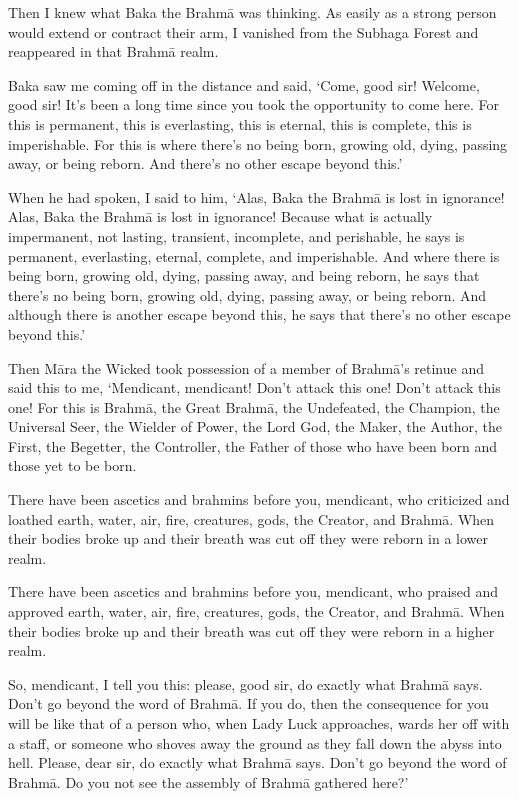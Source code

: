 \documentclass[12pt,openany]{book}%
\begin{document}
Then I knew what Baka the \textsanskrit{Brahmā} was thinking. As easily as a strong person would extend or contract their arm, I vanished from the Subhaga Forest and reappeared in that \textsanskrit{Brahmā} realm. 

Baka saw me coming off in the distance and said, ‘Come, good sir! Welcome, good sir! It’s been a long time since you took the opportunity to come here. For this is permanent, this is everlasting, this is eternal, this is complete, this is imperishable. For this is where there’s no being born, growing old, dying, passing away, or being reborn. And there’s no other escape beyond this.’ 

When he had spoken, I said to him, ‘Alas, Baka the \textsanskrit{Brahmā} is lost in ignorance! Alas, Baka the \textsanskrit{Brahmā} is lost in ignorance! Because what is actually impermanent, not lasting, transient, incomplete, and perishable, he says is permanent, everlasting, eternal, complete, and imperishable. And where there is being born, growing old, dying, passing away, and being reborn, he says that there’s no being born, growing old, dying, passing away, or being reborn. And although there is another escape beyond this, he says that there’s no other escape beyond this.’ 

Then \textsanskrit{Māra} the Wicked took possession of a member of \textsanskrit{Brahmā}’s retinue and said this to me, ‘Mendicant, mendicant! Don’t attack this one! Don’t attack this one! For this is \textsanskrit{Brahmā}, the Great \textsanskrit{Brahmā}, the Undefeated, the Champion, the Universal Seer, the Wielder of Power, the Lord God, the Maker, the Author, the First, the Begetter, the Controller, the Father of those who have been born and those yet to be born. 

There have been ascetics and brahmins before you, mendicant, who criticized and loathed earth, water, air, fire, creatures, gods, the Creator, and \textsanskrit{Brahmā}. When their bodies broke up and their breath was cut off they were reborn in a lower realm. 

There have been ascetics and brahmins before you, mendicant, who praised and approved earth, water, air, fire, creatures, gods, the Creator, and \textsanskrit{Brahmā}. When their bodies broke up and their breath was cut off they were reborn in a higher realm. 

So, mendicant, I tell you this: please, good sir, do exactly what \textsanskrit{Brahmā} says. Don’t go beyond the word of \textsanskrit{Brahmā}. If you do, then the consequence for you will be like that of a person who, when Lady Luck approaches, wards her off with a staff, or someone who shoves away the ground as they fall down the abyss into hell. Please, dear sir, do exactly what \textsanskrit{Brahmā} says. Don’t go beyond the word of \textsanskrit{Brahmā}. Do you not see the assembly of \textsanskrit{Brahmā} gathered here?’ 
\end{document}
